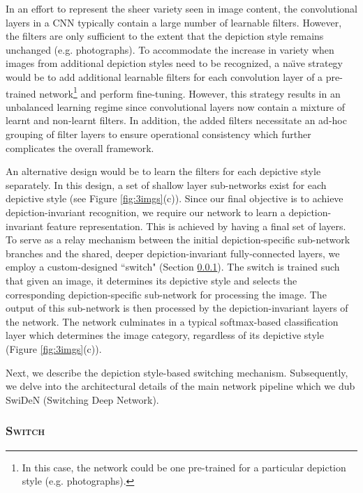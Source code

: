 \documentclass[preprint]{sig-alternate-05-2015}
\begin{document}
In an effort to represent the sheer variety seen in image content, the convolutional layers in a CNN typically contain a large number of learnable filters. However, the filters are only sufficient to the extent that the depiction style remains unchanged (e.g. photographs). To accommodate the increase in variety when images from additional depiction styles need to be recognized, a na\"{\i}ve strategy would be to add additional learnable filters for each convolution layer of a pre-trained network\footnote{In this case, the network could be one pre-trained for a particular depiction style (e.g. photographs).} and perform fine-tuning. However, this strategy results in an unbalanced learning regime since convolutional layers now contain a mixture of learnt and non-learnt filters. In addition, the added filters necessitate an ad-hoc grouping of filter layers to ensure operational consistency which further complicates the overall framework. 

An alternative design would be to learn the filters for each depictive style separately. In this design, a set of shallow layer sub-networks exist for each depictive style (see Figure \ref{fig:3imgs}(c)). Since our final objective is to achieve depiction-invariant recognition, we require our network to learn a depiction-invariant feature representation. This is achieved by having a final set of layers. To serve as a relay mechanism between the initial depiction-specific sub-network branches and the shared, deeper depiction-invariant fully-connected layers, we employ a custom-designed ``switch" (Section \ref{switch}). The switch is trained such that given an image, it determines its depictive style and selects the corresponding depiction-specific sub-network for processing the image. The output of this sub-network is then processed by the depiction-invariant layers of the network. The network culminates in a typical softmax-based classification layer which determines the image category, regardless of its depictive style (Figure \ref{fig:3imgs}(c)). 

Next, we describe the depiction style-based switching mechanism. Subsequently, we delve into the architectural details of the main network pipeline which we dub SwiDeN (Switching Deep Network).

\subsubsection{\textsc{Switch}}
\label{switch}
\end{document}
